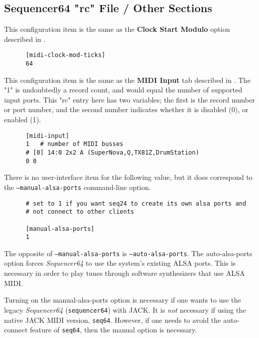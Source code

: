 \subsection{Sequencer64 "rc" File / Other Sections}
\label{subsec:seq64_rc_file_other_midi}

   This configuration item is the same as the
   \textbf{Clock Start Modulo} option described in
   .

   \begin{verbatim}
      [midi-clock-mod-ticks]
      64
   \end{verbatim}

   This configuration item is the same as the 
   \textbf{MIDI Input} tab described in
   .
   The "1" is undoubtedly a record count, and would equal the number of
   supported input ports.
   This "rc" entry here has two variables; the first is the record number or
   port number, and the second number indicates whether it is disabled (0),
   or enabled (1).

   \begin{verbatim}
      [midi-input]
      1   # number of MIDI busses
      # [0] 14:0 2x2 A (SuperNova,Q,TX81Z,DrumStation)
      0 0
   \end{verbatim}

   There is no user-interface item for the following value, but
   it does correspond to the \texttt{--manual-alsa-ports} command-line
   option.

   \begin{verbatim}
      # set to 1 if you want seq24 to create its own alsa ports and
      # not connect to other clients

      [manual-alsa-ports]
      1
   \end{verbatim}

   The opposite of \texttt{--manual-alsa-ports}
   is \texttt{--auto-alsa-ports}.  The auto-alsa-ports option
   forces \textsl{Sequencer64} to use the system's existing ALSA ports.
   This is necessary in order to play tunes through software synthesizers that
   use ALSA MIDI.

   Turning on the manual-alsa-ports option is necessary if one
   wants to use the legacy \textsl{Sequencer64} (\texttt{sequencer64})
   with JACK.
   It is \textsl{not} necessary if using the native JACK MIDI version,
   \texttt{seq64}.
   However, if one needs to avoid the auto-connect feature of \texttt{seq64},
   then the manual option is necessary.

